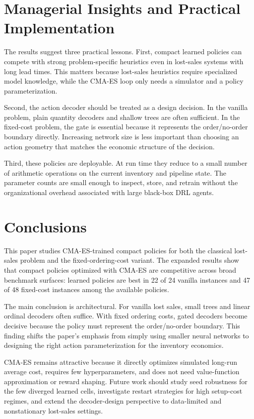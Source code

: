\documentclass[authoryear,11pt]{elsarticle}
\begin{document}
\section{Managerial Insights and Practical Implementation}
\label{sec:managerial_insights}

The results suggest three practical lessons. First, compact learned policies can compete with strong problem-specific heuristics even in lost-sales systems with long lead times. This matters because lost-sales heuristics require specialized model knowledge, while the CMA-ES loop only needs a simulator and a policy parameterization.

Second, the action decoder should be treated as a design decision. In the vanilla problem, plain quantity decoders and shallow trees are often sufficient. In the fixed-cost problem, the gate is essential because it represents the order/no-order boundary directly. Increasing network size is less important than choosing an action geometry that matches the economic structure of the decision.

Third, these policies are deployable. At run time they reduce to a small number of arithmetic operations on the current inventory and pipeline state. The parameter counts are small enough to inspect, store, and retrain without the organizational overhead associated with large black-box DRL agents.

\section{Conclusions}
\label{sec:conclusions}

This paper studies CMA-ES-trained compact policies for both the classical lost-sales problem and the fixed-ordering-cost variant. The expanded results show that compact policies optimized with CMA-ES are competitive across broad benchmark surfaces: learned policies are best in 22 of 24 vanilla instances and 47 of 48 fixed-cost instances among the available policies.

The main conclusion is architectural. For vanilla lost sales, small trees and linear ordinal decoders often suffice. With fixed ordering costs, gated decoders become decisive because the policy must represent the order/no-order boundary. This finding shifts the paper's emphasis from simply using smaller neural networks to designing the right action parameterization for the inventory economics.

CMA-ES remains attractive because it directly optimizes simulated long-run average cost, requires few hyperparameters, and does not need value-function approximation or reward shaping. Future work should study seed robustness for the few diverged learned cells, investigate restart strategies for high setup-cost regimes, and extend the decoder-design perspective to data-limited and nonstationary lost-sales settings.



\end{document}
